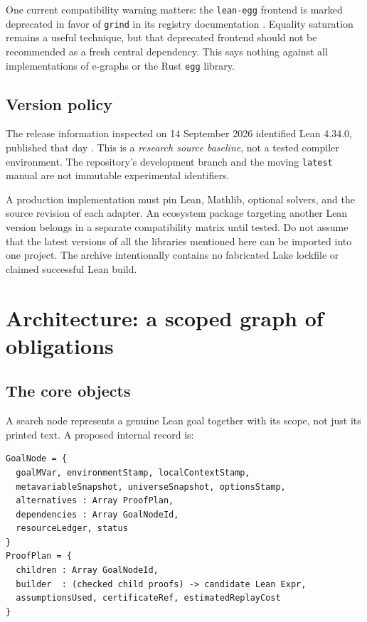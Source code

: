 \documentclass[11pt,letterpaper]{article}
\newcommand{\code}[1]{\texttt{#1}}
\theoremstyle{definition}\newtheorem{definition}[theorem]{Definition}
\theoremstyle{remark}\newtheorem{remark}[theorem]{Remark}
\begin{document}
One current compatibility warning matters: the \code{lean-egg} frontend is marked deprecated in favor of \code{grind} in its registry documentation \cite{egg}. Equality saturation remains a useful technique, but that deprecated frontend should not be recommended as a fresh central dependency. This says nothing against all implementations of e-graphs or the Rust \code{egg} library.

\subsection{Version policy}
The release information inspected on 14 September 2026 identified Lean 4.34.0, published that day \cite{release}. This is a \emph{research source baseline}, not a tested compiler environment. The repository's development branch and the moving \code{latest} manual are not immutable experimental identifiers.

A production implementation must pin Lean, Mathlib, optional solvers, and the source revision of each adapter. An ecosystem package targeting another Lean version belongs in a separate compatibility matrix until tested. Do not assume that the latest versions of all the libraries mentioned here can be imported into one project. The archive intentionally contains no fabricated Lake lockfile or claimed successful Lean build.

\section{Architecture: a scoped graph of obligations}
\subsection{The core objects}
A search node represents a genuine Lean goal together with its scope, not just its printed text. A proposed internal record is:
\par\noindent
\begin{minipage}{\linewidth}
\begin{lstlisting}
GoalNode = {
  goalMVar, environmentStamp, localContextStamp,
  metavariableSnapshot, universeSnapshot, optionsStamp,
  alternatives : Array ProofPlan,
  dependencies : Array GoalNodeId,
  resourceLedger, status
}
ProofPlan = {
  children : Array GoalNodeId,
  builder  : (checked child proofs) -> candidate Lean Expr,
  assumptionsUsed, certificateRef, estimatedReplayCost
}
\end{lstlisting}
\end{minipage}\par
\end{document}
